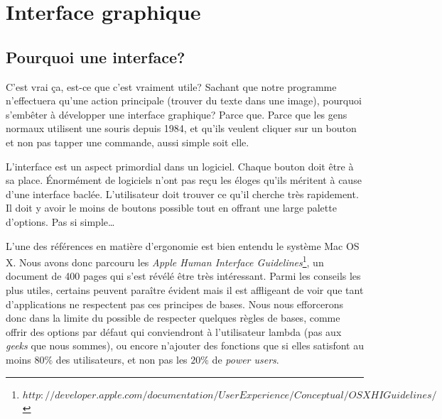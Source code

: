 \documentclass[]{report}
\begin{document}


	\chapter{Interface graphique} %
	\label{cha:interface_graphique}
		\section{Pourquoi une interface?} %
		\label{sec:pourquoi_une_interface_}
		C'est vrai \c ca, est-ce que c'est vraiment utile? Sachant que notre programme n'effectuera qu'une action principale (trouver du texte dans une image), pourquoi s'emb\^eter \`a d\'evelopper une interface graphique? Parce que. Parce que les gens normaux utilisent une souris depuis 1984, et qu'ils veulent cliquer sur un bouton et non pas tapper une commande, aussi simple soit elle.
		
		L'interface est un aspect primordial dans un logiciel. Chaque bouton doit \^etre \`a sa place. \'Enorm\'ement de logiciels n'ont pas re\c cu les \'eloges qu'ils m\'eritent \`a cause d'une interface bacl\'ee. L'utilisateur doit trouver ce qu'il cherche tr\`es rapidement. Il doit y avoir le moins de boutons possible tout en offrant une large palette d'options. Pas si simple\ldots
		
		L'une des r\'ef\'erences en mati\`ere d'ergonomie est bien entendu le syst\`eme Mac OS X. Nous avons donc parcouru les \emph{Apple Human Interface Guidelines}\footnote{$http://developer.apple.com/documentation/UserExperience/Conceptual/OSXHIGuidelines/$}, un document de 400 pages qui s'est r\'ev\'el\'e \^etre tr\`es int\'eressant. Parmi les conseils les plus utiles, certains peuvent para\^itre \'evident mais il est affligeant de voir que tant d'applications ne respectent pas ces principes de bases. Nous nous efforcerons donc dans la limite du possible de respecter quelques r\`egles de bases, comme offrir des options par d\'efaut qui conviendront \`a l'utilisateur lambda (pas aux \emph{geeks} que nous sommes), ou encore n'ajouter des fonctions que si elles satisfont au moins $80\%$ des utilisateurs, et non pas les $20\%$ de \emph{power users}.
		
		
\end{document}
